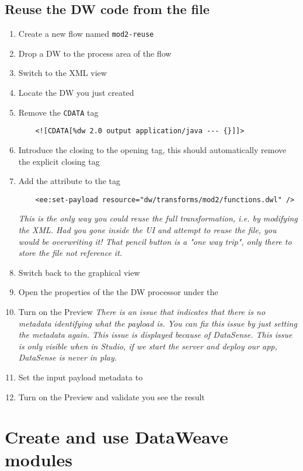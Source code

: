 \subsection{Reuse the DW code from the file}
\begin{enumerate}[resume*]
\item Create a new flow named \lstinline!mod2-reuse!
\item Drop a DW to the process area of the flow
\item Switch to the XML view
\item Locate the DW you just created
\item Remove the \lstinline!CDATA! tag
  \begin{lstlisting}
    <![CDATA[%dw 2.0 output application/java --- {}]]>
  \end{lstlisting}
\item Introduce the \ttt{/} closing to the opening  tag, this should automatically remove the explicit closing tag
\item Add the attribute  to the  tag
  \begin{lstlisting}
    <ee:set-payload resource="dw/transforms/mod2/functions.dwl" />
  \end{lstlisting}
  \emph{
    This is the only way you could reuse the full transformation, i.e. by modifying the XML.  Had you gone inside
    the UI and attempt to reuse the file, you would be overwriting it!  That pencil button is a "one way trip",
    only there to store the file not reference it.
  }
\item Switch back to the graphical view
\item Open the properties of the the DW processor under the 
\item Turn on the Preview
  \emph{
    There is an issue that indicates that there is no metadata identifying what the payload is.  You can fix
    this issue by just setting the metadata again.  This issue is displayed because of DataSense.  This issue
    is only visible when in Studio, if we start the server and deploy our app, DataSense is never in play. 
  }
\item Set the input payload metadata to 
\item Turn on the Preview and validate you see the result
\end{enumerate}



\section{Create and use DataWeave modules}


